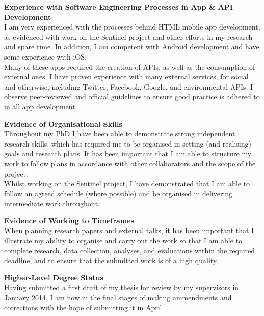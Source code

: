 \documentclass[11pt,a4paper]{article}
\begin{document}
\textbf{Experience with Software Engineering Processes in App \& API Development}\\
I am very experienced with the processes behind HTML mobile app development, as evidenced with work on the Sentinel project and other efforts in my research and  spare time. In addition, I am competent with Android development and have some experience with iOS.\\
Many of these apps required the creation of APIs, as well as the consumption of external ones. I have proven experience with many external services, for social and otherwise, including Twitter, Facebook, Google, and environmental APIs. I observe peer-reviewed and official guidelines to ensure good practice is adhered to in all app development.  

\textbf{Evidence of Organisational Skills}\\
Throughout my PhD I have been able to demonstrate strong independent research skills, which has required me to be organised in setting (and realising) goals and research plans. It has been important that I am able to structure my work to follow plans in accordance with other collaborators and the scope of the project.\\
Whilst working on the Sentinel project, I have demonstrated that I am able to follow an agreed schedule (where possible) and be organised in delivering intermediate work throughout. 

\textbf{Evidence of Working to Timeframes}\\
When planning research papers and external talks, it has been important that I illustrate my ability to organise and carry out the work so that I am able to complete research, data collection, analyses, and evaluations within the required deadline, and to ensure that the submitted work is of a high quality.

\textbf{Higher-Level Degree Status}\\
Having submitted a first draft of my thesis for review by my supervisors in January 2014, I am now in the final stages of making ammendments and corrections with the hope of submitting it in April.
\end{document}

